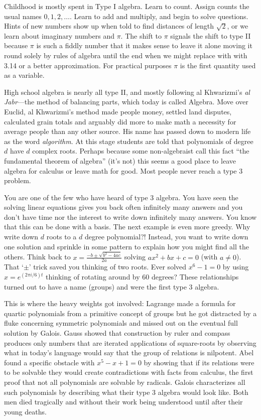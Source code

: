 
Childhood is mostly spent in Type I algebra.  Learn to count. Assign 
counts the usual names $0,1,2,\ldots$.  Learn to add and multiply, and begin 
to solve questions.  Hints of new numbers show up when told to find distances of
length $\sqrt{2}$, or we learn about imaginary numbers and $\pi$.  The shift to $\pi$
signals the shift to type II because $\pi$ is such a fiddly number that it
makes sense to leave it alone moving it round solely by rules of algebra until
the end when we might replace with with 3.14 or a better approximation. For
practical purposes $\pi$ is the first quantity used as a variable. 

High school algebra is nearly all type II, and mostly following al
Khwarizmi's \emph{al Jabr}---the method of balancing parts, which today is
called Algebra.  Move over Euclid, al Khwarizmi's method made people money,
settled land disputes, calculated grain totals and arguably did more to make
math a necessity for average people than any other source. His name has passed
down to modern life as the word \emph{algorithm}. At this stage students are
told  that polynomials of degree $d$ have $d$ complex roots.  Perhaps because
some non-algebraist call this fact ``the fundamental theorem of algebra'' (it's
not) this seems a good place to leave algebra for calculus or leave math for
good.  Most people never reach a type 3 problem.

You are one of the few who have heard of type 3 algebra.
You have seen the solving linear equations gives you back often infinitely many 
answers and you don't have time nor the interest to write down infinitely many answers.
You know that this can be done with a basis.  The next example is even more 
greedy.  Why write down $d$ roots to a $d$ degree polynomial?!  Instead, you 
want to write down one solution and sprinkle in some pattern to explain how you 
might find all the others.  Think back to 
$x=\frac{-b\pm \sqrt{b^2-4ac}}{2a}$ solving $ax^2+bx+c=0$ (with $a\neq 0$).
That `$\pm$' trick saved you thinking of two roots.  Ever solved $x^6-1=0$ by 
using $x=e^{(2\pi i/6) t}$ thinking of rotating around by 60 degrees?  
These relationships turned out to have a name (groups) and were the first type 3 
algebra.

This is where the heavy weights got
involved: Lagrange made a formula for quartic polynomials from a primitive
concept of groups but he got distracted by a fluke concerning symmetric polynomials 
and missed out on the eventual full solution by Galois.
Gauss showed that construction by ruler and compass produces only numbers 
that are iterated applications of square-roots by observing what in today's 
language would say that the group of relations is nilpotent. 
Abel found a specific obstacle with $x^5-x+1=0$ by showing that if its relations 
were to be solvable they would create contradictions with facts from calculus,
the first proof that not all polynomials are solvable by radicals.  
Galois characterizes all such polynomials by describing what their type 3
algebra would look like.  Both men died tragically and without their work being 
understood until after their young deaths.

